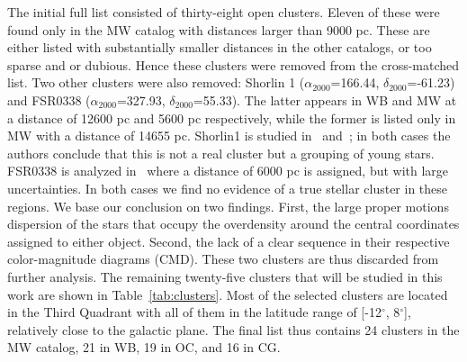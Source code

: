 \documentclass[draft]{aa}
\begin{document}
 The initial full list consisted of thirty-eight open clusters. Eleven of these
 were found only in the MW catalog with distances larger than 9000 pc. These are
 either listed with substantially smaller distances in the other catalogs, or
 too sparse and or dubious. Hence these clusters were removed from the
 cross-matched list.
 Two other clusters were also removed: Shorlin 1 ($\alpha_{2000}$=166.44,
 $\delta_{2000}$=-61.23) and FSR0338
 ($\alpha_{2000}$=327.93, $\delta_{2000}$=55.33). The latter appears in WB and
 MW at a distance of 12600 pc and 5600 pc respectively, while the former is
 listed only in MW with a distance of 14655 pc. Shorlin1 is studied
 in~\cite{Carraro_2009} and~\cite{Turner_2012}; in both cases the authors
 conclude that this is not a real cluster but a grouping of young stars.
 FSR0338 is analyzed in~\cite{Froebrich_2010} where a distance of 6000 pc is
 assigned, but with large uncertainties.
 In both cases we find no evidence of a true stellar cluster in these regions.
 We base our conclusion on two findings. First, the large proper motions
 dispersion of the stars that occupy the overdensity around the central
 coordinates assigned to either object. Second, the lack of a clear sequence in
 their respective color-magnitude diagrams (CMD). These two clusters are thus
 discarded from further analysis. The remaining twenty-five clusters that will
 be studied in this work are shown in Table~\ref{tab:clusters}. Most of the
 selected clusters are located in the Third Quadrant with all of them in the
 latitude range of [-12$^{\circ}$, 8$^{\circ}$], relatively close to the
 galactic plane. The final list thus contains 24 clusters in the MW catalog,
 21 in WB, 19 in OC, and 16 in CG.
\end{document}
